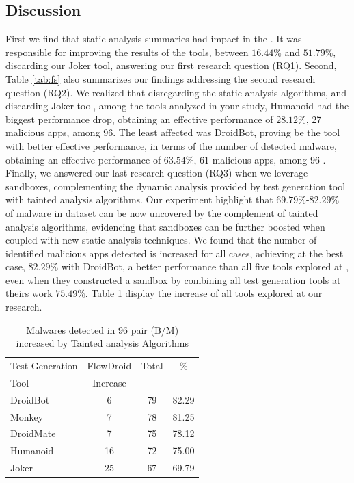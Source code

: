 \subsection{Discussion}\label{sec:discussion}

First we find that static analysis summaries had impact in the \blls. It was responsible for improving the results of the tools, between $16.44\%$ and $51.79\%$, discarding our Joker tool, answering our first research question (RQ1). Second, Table \ref{tab:fs} also summarizes our findings addressing the second research question (RQ2). We realized that disregarding the static analysis algorithms, and discarding Joker tool, among the tools analyzed in your study, Humanoid had the biggest performance drop, obtaining an effective performance of $28.12\%$, 27 malicious apps, among 96. The least affected was DroidBot, proving be the tool with better effective performance, in terms of the number of detected malware, obtaining an effective performance of $63.54\%$, 61 malicious apps, among 96 . Finally, we answered our last research question (RQ3) when we leverage sandboxes, complementing the dynamic analysis provided by test generation tool with tainted analysis algorithms. Our experiment highlight that $69.79\%$-$82.29\%$ of malware in dataset can be now uncovered by the complement of tainted analysis algorithms, evidencing that 
sandboxes can be further boosted when coupled with new static analysis techniques. We found that the number of identified malicious apps detected is increased for all cases, achieving at the best case, $82.29\%$ with DroidBot, a better performance than all five tools explored at \blls, even when they constructed a sandbox by combining all test generation tools at theirs work $75.49\%$. Table \ref{tab:tanted} display the increase of all tools explored at our research.

\begin{table}[ht]
\centering
\begin{tabular}{lccc}\toprule
 Test Generation & FlowDroid & Total & \%\\
 Tool & Increase  &  & \\ \midrule
 DroidBot & 6 & 79 & 82.29\\
 Monkey & 7 &  78 & 81.25 \\
 DroidMate & 7 & 75 & 78.12  \\
 Humanoid & 16 & 72 & 75.00 \\
 Joker & 25 & 67 & 69.79  \\\midrule
 
\end{tabular} 
\caption{Malwares detected in 96 pair (B/M) increased by Tainted analysis Algorithms}
\label{tab:tanted}
\end{table}





